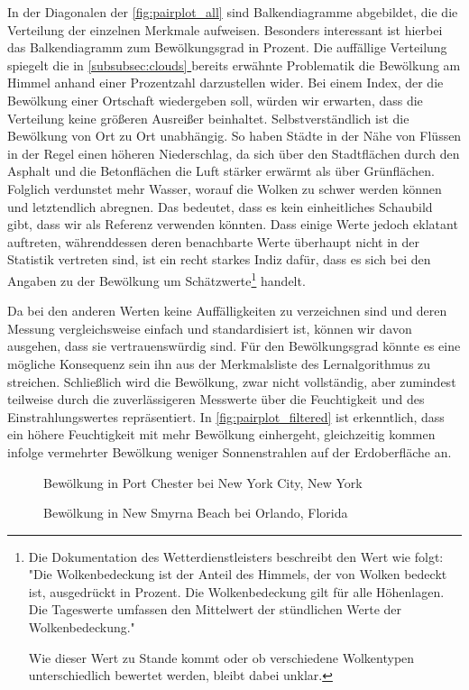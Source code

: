 \documentclass[12pt, a4paper]{article}
\newcommand*{\fullref}[1]{\hyperref[{#1}]{\autoref*{#1} \nameref*{#1}}}
\begin{document}
In der Diagonalen der \autoref{fig:pairplot_all} sind Balkendiagramme abgebildet, die die Verteilung der einzelnen Merkmale aufweisen. Besonders interessant ist hierbei das Balkendiagramm zum Bewölkungsgrad in Prozent. Die auffällige Verteilung spiegelt die in \fullref{subsubsec:clouds} bereits erwähnte Problematik die Bewölkung am Himmel anhand einer Prozentzahl darzustellen wider. Bei einem Index, der die Bewölkung einer Ortschaft wiedergeben soll, würden wir erwarten, dass die Verteilung keine größeren Ausreißer beinhaltet. Selbstverständlich ist die Bewölkung von Ort zu Ort unabhängig. So haben Städte in der Nähe von Flüssen in der Regel einen höheren Niederschlag, da sich über den Stadtflächen durch den Asphalt und die Betonflächen die Luft stärker erwärmt als über Grünflächen. Folglich verdunstet mehr Wasser, worauf die Wolken zu schwer werden können und letztendlich abregnen. Das bedeutet, dass es kein einheitliches Schaubild gibt, dass wir als Referenz verwenden könnten. Dass einige Werte jedoch eklatant auftreten, währenddessen deren benachbarte Werte überhaupt nicht in der Statistik vertreten sind, ist ein recht starkes Indiz dafür, dass es sich bei den Angaben zu der Bewölkung um Schätzwerte\footnote{Die Dokumentation des Wetterdienstleisters beschreibt den Wert wie folgt: "Die Wolkenbedeckung ist der Anteil des Himmels, der von Wolken bedeckt ist, ausgedrückt in Prozent. Die Wolkenbedeckung gilt für alle Höhenlagen. Die Tageswerte umfassen den Mittelwert der stündlichen Werte der Wolkenbedeckung."

Wie dieser Wert zu Stande kommt oder ob verschiedene Wolkentypen unterschiedlich bewertet werden, bleibt dabei unklar.} handelt.

Da bei den anderen Werten keine Auffälligkeiten zu verzeichnen sind und deren Messung vergleichsweise einfach und standardisiert ist, können wir davon ausgehen, dass sie vertrauenswürdig sind. Für den Bewölkungsgrad könnte es eine mögliche Konsequenz sein ihn aus der Merkmalsliste des Lernalgorithmus zu streichen. Schließlich wird die Bewölkung, zwar nicht vollständig, aber zumindest teilweise durch die zuverlässigeren Messwerte über die Feuchtigkeit und des Einstrahlungswertes repräsentiert. In \autoref{fig:pairplot_filtered} ist erkenntlich, dass ein höhere Feuchtigkeit mit mehr Bewölkung einhergeht, gleichzeitig kommen infolge vermehrter Bewölkung weniger Sonnenstrahlen auf der Erdoberfläche an. 

\begin{figure}
\centering
\begin{minipage}[t]{0.45\linewidth}
\centering
\def\svgwidth{210pt}

\caption{Bewölkung in Port Chester bei New York City, New York}
\label{fig:histogram_cc_1220}
\end{minipage}
\hfill
\begin{minipage}[t]{0.45\linewidth}
\centering
\def\svgwidth{200pt}

\caption{Bewölkung in New Smyrna Beach bei Orlando, Florida}
\label{fig:histogram_cc_1231}
\end{minipage}
\end {figure}
\end{document}
